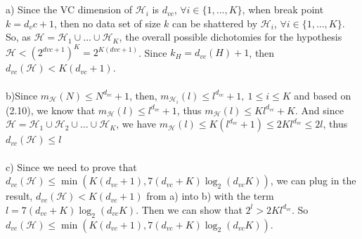 \documentclass[12pt]{article}
\begin{document}
 \\\\
\indent a) Since the VC dimension of $\mathcal{H}_i$ is $d_{vc}$, $\forall i \in \{ 1,...,K\}$, when break point $k = d_vc + 1$, then no data set of size $k$ can be shattered by $\mathcal{H}_i$, $\forall i \in \{1,...,K\}$. So, as $\mathcal{H} = \mathcal{H}_1 \cup ... \cup \mathcal{H}_K$, the overall possible dichotomies for the hypothesis $\mathcal{H} < (2^{dvc+1})^K = 2^{K(dvc+1)}$. Since $k_{H} = d_{vc}(H) + 1$, then $d_{vc}(\mathcal{H}) < K(d_{vc} + 1)$.\\\\
\indent b)Since $m_{\mathcal{H}}(N) \leq N^{d_{vc}}+1 $, then, $m_{\mathcal{H}_i}(l) \leq l^{d_{vc}}+1,\ 1\leq i \leq K$ and based on (2.10), we know that $m_{\mathcal{H}}(l) \leq l^{d_{vc}}+1$, thus $m_{\mathcal{H}}(l) \leq Kl^{d_{vc}}+K$. And since $\mathcal{H} = \mathcal{H}_1\cup\mathcal{H}_2\cup\dots\cup\mathcal{H}_K$, we have $m_{\mathcal{H}}(l) \leq K(l^{d_{vc}}+1)\leq 2Kl^{d_{vc}} \leq 2l$, thus $d_{vc}(\mathcal{H}) \leq l$\\\\
\indent c) Since we need to prove that $d_{vc}(\mathcal{H})\leq \min( K(d_{vc}+1), 7(d_{vc}+K)\log_2(d_{vc}K))$, we can plug in the result, $d_{vc}(\mathcal{H}) < K(d_{vc}+1)$ from a) into b) with the term $l = 7(d_{vc}+K)\log_2(d_{vc}K)$. Then we can show that $2^l > 2Kl^{d_{vc}}$. So $d_{vc}(\mathcal{H})\leq \min( K(d_{vc}+1), 7(d_{vc}+K)\log_2(d_{vc}K) )$.\\\\
\end{document}
